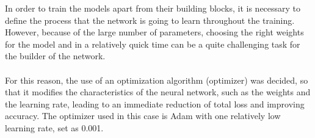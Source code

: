 In order to train the models apart from their building blocks, it is necessary to define the process that the network is going to learn throughout the training. However, because of the large number of parameters, choosing the right weights for the model and in a relatively quick time can be a quite challenging task for the builder of the network. \\~\\
For this reason, the use of an optimization algorithm (optimizer) was decided, so that it modifies the characteristics of the neural network, such as the weights and the learning rate, leading to an immediate reduction of total loss and improving accuracy. The optimizer used in this case is Adam with one relatively low learning rate, set as 0.001.
